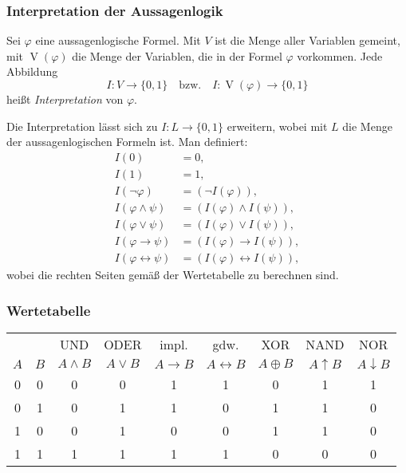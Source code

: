 \documentclass[a4paper,11pt,fleqn,twoside]{scrartcl}
\numberwithin{equation}{section}
\newcommand{\strong}[1]{{\normalfont\sffamily\bfseries #1}}
\newenvironment{Definition}{\par\noindent\strong{Definition.}}{\par}
\newcommand{\emdef}[1]{\emph{#1}}
\newcommand{\pstrut}[1]{\rule{0pt}{\dimexpr 8pt+#1}}
\begin{document}
\subsubsection{Interpretation der Aussagenlogik}
\begin{Definition}
Sei $\varphi$ eine aussagenlogische Formel. Mit $V$ ist die
Menge aller Variablen gemeint, mit $\operatorname{V}(\varphi)$ die
Menge der Variablen, die in der Formel $\varphi$ vorkommen.
Jede Abbildung%
\begin{equation}
I\colon V\to\{0,1\}\quad\text{bzw.}\quad
I\colon\operatorname{V}(\varphi)\to\{0,1\}
\end{equation}
heißt \emdef{Interpretation} von $\varphi$.

Die Interpretation lässt sich zu $I\colon L\to\{0,1\}$
erweitern, wobei mit $L$ die Menge der aussagenlogischen Formeln
ist. Man definiert:
\begin{align}
I(0) &= 0,\\
I(1) &= 1,\\
I(\neg\varphi) &= (\neg I(\varphi)),\\
I(\varphi\land\psi) &= (I(\varphi)\land I(\psi)),\\
I(\varphi\lor\psi) &= (I(\varphi)\lor I(\psi)),\\
I(\varphi\rightarrow\psi) &= (I(\varphi)\rightarrow I(\psi)),\\
I(\varphi\leftrightarrow\psi) &= (I(\varphi)\leftrightarrow I(\psi)),
\end{align}
wobei die rechten Seiten gemäß der Wertetabelle zu berechnen sind.
\end{Definition}

\subsubsection*{Wertetabelle}
\begin{tabular}{c|c|c|c|c|c|c|c|c}
& & UND & ODER & impl. & gdw. & XOR & NAND & NOR\\
$A$ & $B$ & $A\land B$ & $A\lor B$
& $A\rightarrow B$ & $A\leftrightarrow B$
& $A\oplus B$ & $A\uparrow B$ & $A\downarrow B$\\
\hline\pstrut{4pt}%
0 & 0 & 0 & 0 & 1 & 1 & 0 & 1 & 1\\
0 & 1 & 0 & 1 & 1 & 0 & 1 & 1 & 0\\
1 & 0 & 0 & 1 & 0 & 0 & 1 & 1 & 0\\
1 & 1 & 1 & 1 & 1 & 1 & 0 & 0 & 0
\end{tabular}
\end{document}
